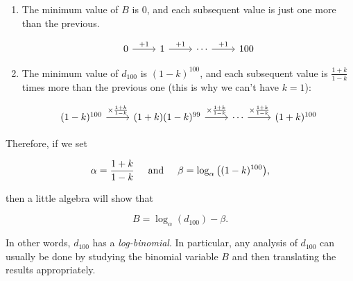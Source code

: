 \documentclass[12pt, oneside]{book}
\theoremstyle{plain}
\theoremstyle{definition}
\begin{document}
\begin{enumerate}
\item The minimum value of $B$ is $0$, and each subsequent value is just one more than the previous.

\[
\begin{tikzcd}
0 \arrow{r}{+1} & 1 \arrow{r}{+1} & \cdots \arrow{r}{+1} & 100
\end{tikzcd}
\]

\item The minimum value of $d_{100}$ is $(1-k)^{100}$, and each subsequent value is $\frac{1+k}{1-k}$ times more than the previous one (this is why we can't have $k=1$):

\[
\begin{tikzcd}
(1-k)^{100} \arrow{r}{\times \frac{1+k}{1-k}} & (1+k)(1-k)^{99} \arrow{r}{\times \frac{1+k}{1-k}} & \cdots \arrow{r}{\times \frac{1+k}{1-k}} & (1+k)^{100}
\end{tikzcd}
\]

\end{enumerate}

\noindent Therefore, if we set

\[
\alpha = \frac{1+k}{1-k} \hspace{5mm} \text{and} \hspace{5mm} \beta = \log_{\alpha} \big ( (1-k)^{100} \big ),
\]

\noindent then a little algebra will show that

\[
B = \log_{\alpha}(d_{100}) - \beta.
\]

\noindent In other words, $d_{100}$ has a \textit{log-binomial}. In particular, any analysis of $d_{100}$ can usually be done by studying the binomial variable $B$ and then translating the results appropriately.
\end{document}
